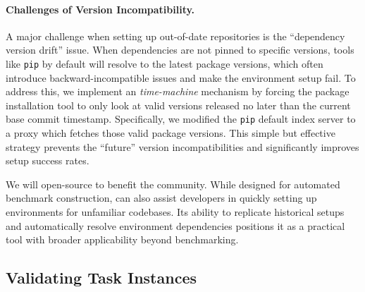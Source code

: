 \paragraph{Challenges of Version Incompatibility.}  
A major challenge when setting up out-of-date repositories is the ``dependency version drift'' issue. When dependencies are not pinned to specific versions, tools like \texttt{pip} by default will resolve to the latest package versions, which often introduce backward-incompatible issues and make the environment setup fail.  To address this, we implement an \textit{time-machine} mechanism by forcing the package installation tool to only look at valid versions released no later than the current base commit timestamp. Specifically, we modified the \texttt{pip} default index server to a proxy which fetches those valid package versions. This simple but effective strategy prevents the ``future'' version incompatibilities and significantly improves setup success rates.

We will open-source \method to benefit the community. While designed for automated benchmark construction, \method can also assist developers in quickly setting up environments for unfamiliar codebases. Its ability to replicate historical setups and automatically resolve environment dependencies positions it as a practical tool with broader applicability beyond benchmarking.


\subsection{Validating Task Instances}

